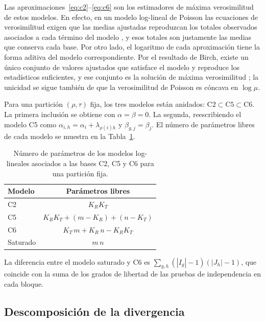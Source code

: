 Las aproximaciones~\eqref{eq:c2}--\eqref{eq:c6} son los estimadores de máxima
verosimilitud de estos modelos. En efecto, en un modelo log-lineal de Poisson las
ecuaciones de verosimilitud exigen que las medias ajustadas reproduzcan los
totales observados asociados a cada término del modelo
\cite[Secs.~4.4.9 y~9.6.2]{Agresti2013}, y esos totales son justamente las medias
que conserva cada base. Por otro lado, el logaritmo de cada aproximación tiene la
forma aditiva del modelo correspondiente. Por el resultado de Birch, existe un
único conjunto de valores ajustados que satisface el modelo y reproduce los
estadísticos suficientes, y ese conjunto es la solución de máxima verosimilitud
\cite[Sec.~9.6.3]{Agresti2013}; la unicidad se sigue también de que la
verosimilitud de Poisson es cóncava en $\log \mu$.

Para una partición $(\rho, \tau)$ fija, los tres modelos están anidados:
$\mathrm{C2} \subset \mathrm{C5} \subset \mathrm{C6}$. La primera inclusión se
obtiene con $\alpha = \beta = 0$. La segunda, reescribiendo el modelo C5 como
$\alpha_{i,h} = \alpha_i + \lambda_{\rho(i) h}$ y $\beta_{g,j} = \beta_j$. El
número de parámetros libres de cada modelo se muestra en la
Tabla~\ref{tab:parametros}.

\begin{table}[ht]
  \centering
  {\footnotesize
  \begin{tabular}{@{}lc@{}}
    \toprule
    \textbf{Modelo} & \textbf{Parámetros libres} \\
    \midrule
    C2 & $K_R K_T$ \\
    C5 & $K_R K_T + (m - K_R) + (n - K_T)$ \\
    C6 & $K_T\, m + K_R\, n - K_R K_T$ \\
    Saturado & $m\,n$ \\
    \bottomrule
  \end{tabular}
  }
  \caption{Número de parámetros de los modelos log-lineales asociados a las bases
  C2, C5 y C6 para una partición fija.}
  \label{tab:parametros}
\end{table}

La diferencia entre el modelo saturado y C6 es
$\sum_{g,h} (|I_g| - 1)(|J_h| - 1)$, que coincide con la suma de los grados de
libertad de las pruebas de independencia en cada bloque.

\subsection{Descomposición de la divergencia}\label{sec:descomposicion}

